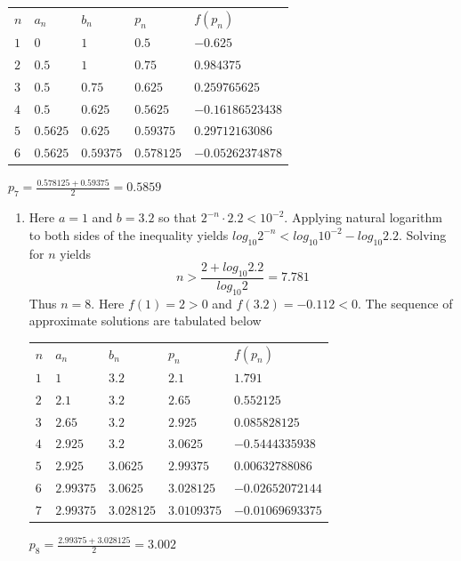 \begin{myexercise}
\begin{mysolution}
\begin{enumerate}
\begin{center}
\begin{tabular}{lllll}\hline
$n$&$a_n$&$b_n$&$p_n$&$f(p_n)$\\
$1$&$0$&$1$&$0.5$&$-0.625$\\
$2$&$0.5$&$1$&$0.75$&$0.984375$\\
$3$&$0.5$&$0.75$&$0.625$&$0.259765625$\\
$4$&$0.5$&$0.625$&$0.5625$&$-0.16186523438$\\
$5$&$0.5625$&$0.625$&$0.59375$&$0.29712163086$\\
$6$&$0.5625$&$0.59375$&$0.578125$&$-0.05262374878$\\\hline
\end{tabular}
\end{center}

\vspace{3mm}
$p_7=\frac{0.578125+0.59375}{2}=0.5859$ 

\begin{enumerate}
\item[(b)] Here $a=1$ and $b=3.2$ so that $2^{-n}\cdot2.2<10^{-2}$. Applying natural logarithm to both sides of the inequality yields $log_{10}2^{-n}<log_{10}10^{-2}-log_{10}2.2$. Solving for $n$ yields 
\[n>\frac{2+log_{10}2.2}{log_{10}2}=7.781\]
Thus $n=8$. Here $f(1)=2>0$ and $f(3.2)=-0.112<0$. The sequence of approximate solutions are tabulated below
\begin{center}
\begin{tabular}{lllll}\hline
$n$&$a_n$&$b_n$&$p_n$&$f(p_n)$\\
$1$&$1$&$3.2$&$2.1$&$1.791$\\
$2$&$2.1$&$3.2$&$2.65$&$0.552125$\\
$3$&$2.65$&$3.2$&$2.925$&$0.085828125$\\
$4$&$2.925$&$3.2$&$3.0625$&$-0.5444335938$\\
$5$&$2.925$&$3.0625$&$2.99375$&$0.00632788086$\\
$6$&$2.99375$&$3.0625$&$3.028125$&$-0.02652072144$\\
$7$&$2.99375$&$3.028125$&$3.0109375$&$-0.01069693375$\\\hline
\end{tabular}
\end{center}
%
$p_8=\frac{2.99375+3.028125}{2}=3.002$


\end{enumerate}
\end{enumerate}
\end{mysolution}
\end{myexercise}
